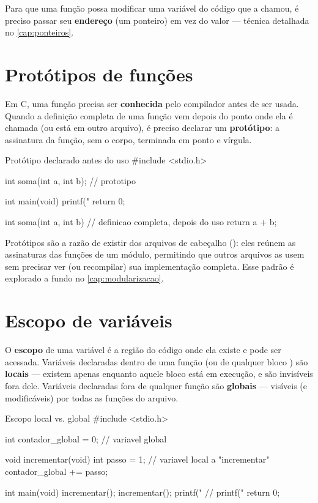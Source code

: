 Para que uma função possa modificar uma variável do código que a chamou, é preciso passar seu \textbf{endereço} (um ponteiro) em vez do valor — técnica detalhada no \cref{cap:ponteiros}.

\section{Protótipos de funções}

Em C, uma função precisa ser \textbf{conhecida} pelo compilador antes de ser usada. Quando a definição completa de uma função vem depois do ponto onde ela é chamada (ou está em outro arquivo), é preciso declarar um \textbf{protótipo}: a assinatura da função, sem o corpo, terminada em ponto e vírgula.

\begin{codigoc}{Protótipo declarado antes do uso}
#include <stdio.h>

int soma(int a, int b);   // prototipo

int main(void) {
    printf("%
    return 0;
}

int soma(int a, int b) {   // definicao completa, depois do uso
    return a + b;
}
\end{codigoc}

\begin{dica}
Protótipos são a razão de existir dos arquivos de cabeçalho (): eles reúnem as assinaturas das funções de um módulo, permitindo que outros arquivos  as usem sem precisar ver (ou recompilar) sua implementação completa. Esse padrão é explorado a fundo no \cref{cap:modularizacao}.
\end{dica}

\section{Escopo de variáveis}

O \textbf{escopo} de uma variável é a região do código onde ela existe e pode ser acessada. Variáveis declaradas dentro de uma função (ou de qualquer bloco \code{\{ \}}) são \textbf{locais} — existem apenas enquanto aquele bloco está em execução, e são invisíveis fora dele. Variáveis declaradas fora de qualquer função são \textbf{globais} — visíveis (e modificáveis) por todas as funções do arquivo.

\begin{codigoc}{Escopo local vs. global}
#include <stdio.h>

int contador_global = 0;   // variavel global

void incrementar(void) {
    int passo = 1;          // variavel local a "incrementar"
    contador_global += passo;
}

int main(void) {
    incrementar();
    incrementar();
    printf("%
    // printf("%
    return 0;
}
\end{codigoc}


